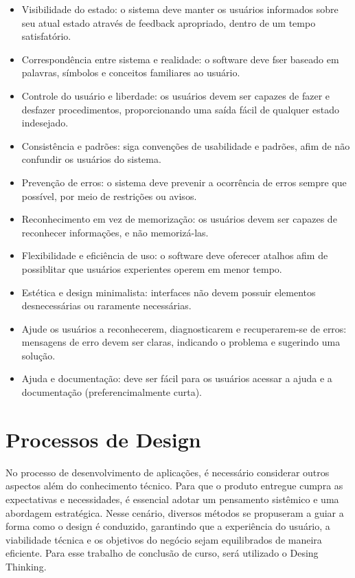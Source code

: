 \begin{itemize}
    \item Visibilidade do estado: o sistema deve manter os usuários informados sobre seu atual estado através de feedback apropriado, dentro de um tempo satisfatório.
    \item Correspondência entre sistema e realidade: o software deve fser baseado em palavras, símbolos e conceitos familiares ao usuário.
    \item Controle do usuário e liberdade: os usuários devem ser capazes de fazer e desfazer procedimentos, proporcionando uma saída fácil de qualquer estado indesejado.
    \item Consistência e padrões: siga convenções de usabilidade e padrões, afim de não confundir os usuários do sistema.
    \item Prevenção de erros: o sistema deve prevenir a ocorrência de erros sempre que possível, por meio de restrições ou avisos.
    \item Reconhecimento em vez de memorização: os usuários devem ser capazes de reconhecer informações, e não memorizá-las.
    \item Flexibilidade e eficiência de uso: o software deve oferecer atalhos  afim de possiblitar que usuários experientes operem em menor tempo.
    \item Estética e design minimalista: interfaces não devem possuir elementos desnecessárias ou raramente necessárias.
    \item Ajude os usuários a reconhecerem, diagnosticarem e recuperarem-se de erros: mensagens de erro devem ser claras, indicando o problema e sugerindo uma solução.
    \item Ajuda e documentação: deve ser fácil para os usuários acessar a ajuda e a documentação (preferencimalmente curta).
\end{itemize}

\section{Processos de Design}
No processo de desenvolvimento de aplicações, é necessário considerar outros aspectos além do conhecimento técnico. Para que o produto entregue cumpra as expectativas e necessidades, é essencial adotar um pensamento sistêmico e uma abordagem estratégica. Nesse cenário, diversos métodos se propuseram a guiar a forma como o design é conduzido, garantindo que a experiência do usuário, a viabilidade técnica e os objetivos do negócio sejam equilibrados de maneira eficiente. Para esse trabalho de conclusão de curso, será utilizado o Desing Thinking.

